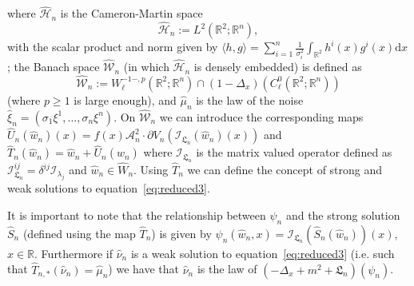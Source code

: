 \documentclass[a4paper,10pt]{article}
\newcommand{\assign}{:=}
\newcommand{\asterisk}{\mathord{*}}
\newcommand{\mathd}{\mathrm{d}}
\begin{document}
where $\widehat{\mathcal{H}}_n$ is the Cameron-Martin space
\[ \widehat{\mathcal{H}}_n \assign L^2 (\mathbb{R}^2 ; \mathbb{R}^n), \]
with the scalar product and norm given by $\langle h, g \rangle = \sum_{i =
1}^n \frac{1}{\sigma_i^2} \int_{\mathbb{R}^2} h^i (x) g^i (x) \mathd x$; the
Banach space $\widehat{\mathcal{W}}_n$ (in which $\widehat{\mathcal{H}}_n$ is
densely embedded) is defined as
\[ \widehat{\mathcal{W}}_n \assign W^{- 1 -, p}_{\ell} (\mathbb{R}^2 ;
   \mathbb{R}^n) \cap (1 - \Delta_x) (C^0_{\ell} (\mathbb{R}^2 ;
   \mathbb{R}^n)) \]
(where $p \geqslant 1$ is large enough), and $\hat{\mu}_n$ is the law of the
noise $\hat{\xi}_n = (\sigma_1 \xi^1, \ldots, \sigma_n \xi^n)$. On
$\widehat{\mathcal{W}}_n$ we can introduce the corresponding maps $\hat{U}_n
(\hat{w}_n) (x) = f (x)  \mathcal{A}^2_n \cdot \partial V_n
(\mathcal{I}_{\mathfrak{L}_n} (\hat{w}_n) (x))$ and $\hat{T}_n (\hat{w}_n) =
\hat{w}_n + \hat{U}_n (\hat{w}_n)$ where $\mathcal{I}_{\mathfrak{L}_n}$ is the
matrix valued operator defined as $\mathcal{I}_{\mathfrak{L}_n}^{i j} =
\delta^{i j} \mathcal{I}_{\lambda_j}$ and $\hat{w}_n \in \widehat{W}_n$. Using
$\hat{T}_n$ we can define the concept of strong and weak solutions to
equation~{\eqref{eq:reduced3}}.

\begin{remark}
  It is important to note that the relationship between $\psi_n$ and the
  strong solution $\hat{S}_n$ (defined using the map $\hat{T}_n$) is given by
  $\psi_n (\hat{w}_n, x) =  \mathcal{I}_{\mathfrak{L}_n} (\hat{S}_n
  (\hat{w}_n)) (x)$, $x \in \mathbb{R}$. Furthermore if $\hat{\nu}_n$ is a
  weak solution to equation~{\eqref{eq:reduced3}} (i.e. such that $\hat{T}_{n,
  \asterisk} (\hat{\nu}_n) = \hat{\mu}_n$) we have that $\hat{\nu}_n$ is the
  law of $(- \Delta_x + m^2 + \mathfrak{L}_n) (\psi_n)$.
\end{remark}
\end{document}
